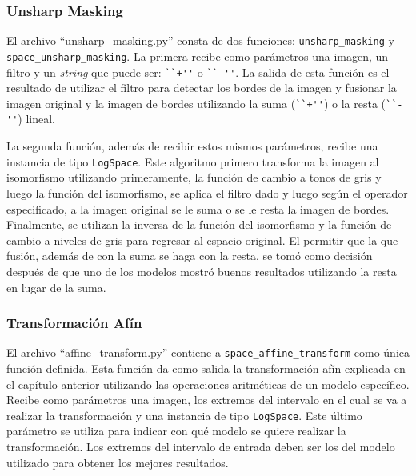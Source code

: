 \subsubsection{Unsharp Masking}

El archivo ``unsharp\_masking.py'' consta de dos funciones: \verb|unsharp_masking| y \verb|space_unsharp_masking|. La primera recibe como par\'ametros una imagen, un filtro y un \textit{string} que puede ser: \verb|``+''| o \verb|``-''|. La salida de esta funci\'on es el resultado de utilizar el filtro para detectar los bordes de la imagen y fusionar la imagen original y la imagen de bordes utilizando la suma (\verb|``+''|) o la resta (\verb|``-''|) lineal. 

La segunda funci\'on, adem\'as de recibir estos mismos par\'ametros, recibe una instancia de tipo \verb|LogSpace|. Este algoritmo primero transforma la imagen al isomorfismo utilizando primeramente, la funci\'on de cambio a tonos de gris y luego la funci\'on del isomorfismo, se aplica el filtro dado y luego seg\'un el operador especificado, a la imagen original se le suma o se le resta la imagen de bordes. Finalmente, se utilizan la inversa de la funci\'on del isomorfismo y la funci\'on de cambio a niveles de gris para regresar al espacio original. El permitir que la que fusi\'on, adem\'as de con la suma se haga con la resta, se tom\'o como decisi\'on despu\'es de que uno de los modelos mostr\'o buenos resultados utilizando la resta en lugar de la suma. 

\subsubsection{Transformaci\'on Af\'in}

El archivo ``affine\_transform.py'' contiene a \verb|space_affine_transform| como \'unica funci\'on definida. Esta funci\'on da como salida la transformaci\'on af\'in explicada en el cap\'itulo anterior utilizando las operaciones aritm\'eticas de un modelo espec\'ifico. Recibe como par\'ametros una imagen, los extremos del intervalo en el cual se va a realizar la transformaci\'on y una instancia de tipo \verb|LogSpace|. Este \'ultimo par\'ametro se utiliza para indicar con qu\'e modelo se quiere realizar la transformaci\'on. Los extremos del intervalo de entrada deben ser los del modelo utilizado para obtener los mejores resultados.

